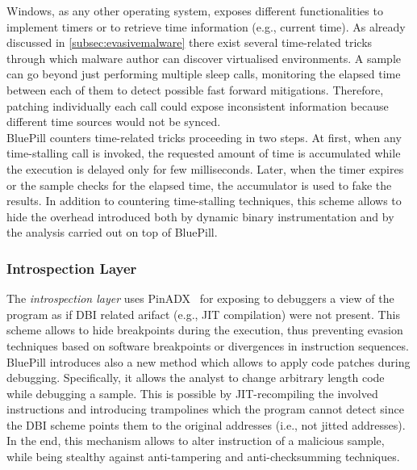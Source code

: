\documentclass[LaM,binding=0.6cm]{sapthesis}
\begin{document}
Windows, as any other operating system, exposes different functionalities to implement timers or to retrieve time information (e.g., current time). As already discussed in \autoref{subsec:evasivemalware} there exist several time-related tricks through which malware author can discover virtualised environments. A sample can go beyond just performing multiple sleep calls, monitoring the elapsed time between each of them to detect possible fast forward mitigations. Therefore, patching individually each call could expose inconsistent information because different time sources would not be synced.\\
BluePill counters time-related tricks proceeding in two steps. At first, when any time-stalling call is invoked, the requested amount of time is accumulated while the execution is delayed only for few milliseconds. Later, when the timer expires or the sample checks for the elapsed time, the accumulator is used to fake the results. In addition to countering time-stalling techniques, this scheme allows to hide the overhead introduced both by dynamic binary instrumentation and by the analysis carried out on top of BluePill.

\subsubsection{Introspection Layer}
The \textit{introspection layer} uses PinADX~\cite{lueck2012pinadx} for exposing to debuggers a view of the program as if DBI related arifact (e.g., JIT compilation) were not present. This scheme allows to hide breakpoints during the execution, thus preventing evasion techniques based on software breakpoints or divergences in instruction sequences.\\
BluePill introduces also a new method which allows to apply code patches during debugging. Specifically, it allows the analyst to change arbitrary length code while debugging a sample. This is possible by JIT-recompiling the involved instructions and introducing trampolines which the program cannot detect since the DBI scheme points them to the original addresses (i.e., not jitted addresses). In the end, this mechanism allows to alter instruction of a malicious sample, while being stealthy against anti-tampering and anti-checksumming techniques.
\end{document}
